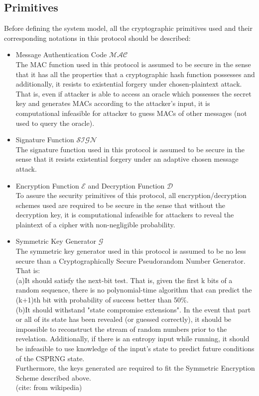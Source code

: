 \subsection{Primitives}
Before defining the system model, all the cryptographic primitives used and their corresponding notations in this protocol should be described:
\begin{itemize}
\item Message Authentication Code $\mathcal{MAC}$\\
The MAC function used in this protocol is assumed to be secure in the sense that it has all the properties that a cryptographic hash function possesses and additionally, it resists to existential forgery under chosen-plaintext attack. That is, even if attacker is able to access an oracle which possesses the secret key and generates MACs according to the attacker's input, it is computational infeasible for attacker to guess MACs of other messages (not used to query the oracle).

\item Signature Function $\mathcal{SIGN}$\\
The signature function used in this protocol is assumed to be secure in the sense that it resists existential forgery under an adaptive chosen message attack. \cite{goldwasser}

\item Encryption Function $\mathcal{E}$ and Decryption Function $\mathcal{D}$\\
To assure the security primitives of this protocol, all encryption/decryption schemes used are required to be secure in the sense that without the decryption key, it is computational infeasible for attackers to reveal the plaintext of a cipher with non-negligible probability.

\item Symmetric Key Generator $\mathcal{G}$\\
The symmetric key generator used in this protocol is assumed to be no less secure than a Cryptographically Secure Pseudorandom Number Generator. That is: \\
(a)It should satisfy the next-bit test. That is, given the first k bits of a random sequence, there is no polynomial-time algorithm that can predict the (k+1)th bit with probability of success better than 50\%. \\
(b)It should withstand "state compromise extensions". In the event that part or all of its state has been revealed (or guessed correctly), it should be impossible to reconstruct the stream of random numbers prior to the revelation. Additionally, if there is an entropy input while running, it should be infeasible to use knowledge of the input's state to predict future conditions of the CSPRNG state.\\
Furthermore, the keys generated are required to fit the Symmetric Encryption Scheme described above.
\\
(cite: from wikipedia)
\end{itemize}

